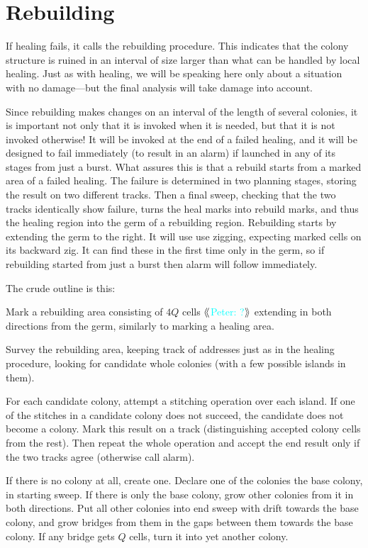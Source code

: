 \documentclass[12pt]{memoir}
\newcommand{\authnote}[3]
{{ \textcolor{#3}{$\langle\hspace{-0.2em}\langle$\textsf{\footnotesize #1: #2}$\rangle\hspace{-0.2em}\rangle$}}}
\newcommand{\authnote}[2]{}
\newcommand{\Pnote}[1]{{\authnote{Peter}{#1}{cyan}}}
\begin{document}
\section{Rebuilding}\label{sec:rebuilding}

If healing fails, it calls the rebuilding procedure.
This indicates that the colony structure is ruined in an interval of size larger than 
what can be handled by local healing.
Just as with healing, we will be speaking here only about a situation with no 
damage---but the final analysis will take damage into account.

Since rebuilding makes changes on an interval of the length of several colonies,
it is important not only that it is invoked when it is needed, but that it is not
invoked otherwise!
It will be invoked at the end of a failed healing, and it will be designed
to fail immediately (to result in an alarm) 
if launched in any of its stages from just a burst.
What assures this is that a rebuild starts from a marked area of a failed
healing.
The failure is determined
in two planning stages, storing the result on two different tracks.
Then a final sweep, checking that the two tracks identically show failure, turns
the heal marks into rebuild marks, and thus the healing region into the germ of a
rebuilding region.
Rebuilding starts by extending the germ to the right.
It will use use zigging, expecting marked cells on its backward zig.
It can find these in the first time only in the germ, so if rebuilding 
started from just a burst then alarm will follow immediately.

The crude outline is this:
\begin{bullets}
 \item Mark a rebuilding area consisting of \( 4Q \) cells \Pnote{?}
   extending in both directions from the germ, similarly to marking a healing area.

 \item Survey the rebuilding area, keeping track of addresses just as in the healing procedure,
  looking for candidate whole colonies (with a few possible islands in them).

 \item For each candidate colony, attempt a stitching operation over each island.
 If one of the stitches in a candidate colony does not succeed,
 the candidate does not become a colony.
 Mark this result on a track (distinguishing accepted colony cells from the rest).
 Then repeat the whole operation and accept the end result only if the two tracks agree
 (otherwise call alarm).
 
\item If there is no colony at all, create one.
  Declare one of the colonies the base colony, in starting sweep.
  If there is only the base colony, grow other colonies from it in both directions.
  Put all other colonies into end sweep with drift towards the base colony, and
  grow bridges from them in the gaps between them towards the base colony.
  If any bridge gets \( Q \) cells, turn it into yet another colony.

\end{bullets}
\end{document}
